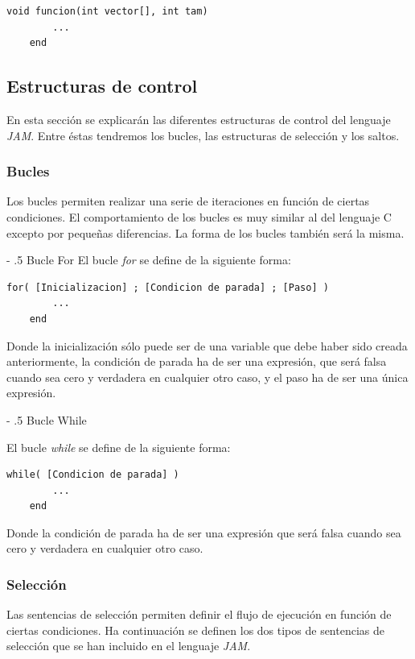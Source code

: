 \documentclass[a4paper,10pt]{article}
\makeatletter
\renewcommand\paragraph{%
   \@startsection{paragraph}{4}{0mm}%
      {-\baselineskip}%
      {.5\baselineskip}%
      {\normalfont\normalsize\bfseries}}
\makeatother
\begin{document}
\begin{lstlisting}[language=jam]
	void funcion(int vector[], int tam)
		...
	end
\end{lstlisting}

\subsection{Estructuras de control}

En esta sección se explicarán las diferentes estructuras de control del lenguaje \textit{JAM}. Entre éstas tendremos los bucles, las estructuras de selección y los saltos.
\subsubsection*{Bucles}
Los bucles permiten realizar una serie de iteraciones en función de ciertas condiciones. El comportamiento de los bucles es muy similar al del lenguaje C excepto por pequeñas diferencias. La forma de los bucles también será la misma.

\paragraph{Bucle For}
\noindent El bucle \emph{for} se define de la siguiente forma:

\begin{lstlisting}[language=jam]
	for( [Inicializacion] ; [Condicion de parada] ; [Paso] )
		...
	end
\end{lstlisting}

Donde la inicialización sólo puede ser de una variable que debe haber sido creada anteriormente, la condición de parada ha de ser una expresión, que será falsa cuando sea cero y verdadera en cualquier otro caso, y el paso ha de ser una única expresión.

\paragraph{Bucle While}

\noindent El bucle \emph{while} se define de la siguiente forma:

\begin{lstlisting}[language=jam]
	while( [Condicion de parada] )
		...
	end
\end{lstlisting}

Donde la condición de parada ha de ser una expresión que será falsa cuando sea cero y verdadera en cualquier otro caso.
\subsubsection*{Selección}
Las sentencias de selección permiten definir el flujo de ejecución en función de ciertas condiciones. Ha continuación se definen los dos tipos de sentencias de selección que se han incluido en el lenguaje \textit{JAM}.
\end{document}
